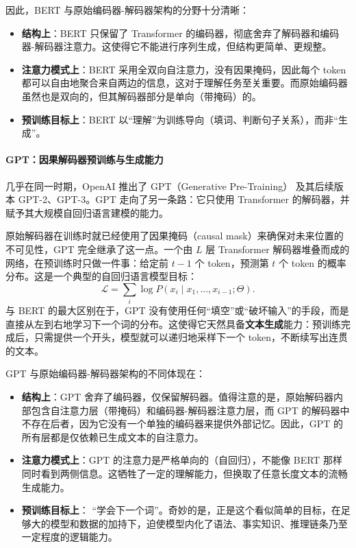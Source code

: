 因此，BERT 与原始编码器-解码器架构的分野十分清晰：
\begin{itemize}
    \item \textbf{结构上}：BERT 只保留了 Transformer 的编码器，彻底舍弃了解码器和编码器-解码器注意力。这使得它不能进行序列生成，但结构更简单、更规整。
    \item \textbf{注意力模式上}：BERT 采用全双向自注意力，没有因果掩码，因此每个 token 都可以自由地聚合来自两边的信息，这对于理解任务至关重要。而原始编码器虽然也是双向的，但其解码器部分是单向（带掩码）的。
    \item \textbf{预训练目标上}：BERT 以“理解”为训练导向（填词、判断句子关系），而非“生成”。
\end{itemize}

\paragraph{GPT：因果解码器预训练与生成能力}

几乎在同一时期，OpenAI 推出了 GPT（Generative Pre-Training）\cite{2018Improving} 及其后续版本 GPT-2、GPT-3\cite{brown2020languagemodelsfewshotlearners}。GPT 走向了另一条路：它只使用 Transformer 的解码器，并赋予其大规模自回归语言建模的能力。

原始解码器在训练时就已经使用了因果掩码（causal mask）来确保对未来位置的不可见性，GPT 完全继承了这一点。一个由 $L$ 层 Transformer 解码器堆叠而成的网络，在预训练时只做一件事：给定前 $t-1$ 个 token，预测第 $t$ 个 token 的概率分布。这是一个典型的自回归语言模型目标：
\[
\mathcal{L} = \sum_{i} \log P(x_i \mid x_1, \dots, x_{i-1}; \Theta).
\]
与 BERT 的最大区别在于，GPT 没有使用任何“填空”或“破坏输入”的手段，而是直接从左到右地学习下一个词的分布。这使得它天然具备\textbf{文本生成}能力：预训练完成后，只需提供一个开头，模型就可以递归地采样下一个 token，不断续写出连贯的文本。

GPT 与原始编码器-解码器架构的不同体现在：
\begin{itemize}
    \item \textbf{结构上}：GPT 舍弃了编码器，仅保留解码器。值得注意的是，原始解码器内部包含自注意力层（带掩码）和编码器-解码器注意力层，而 GPT 的解码器中不存在后者，因为它没有一个单独的编码器来提供外部记忆。因此，GPT 的所有层都是仅依赖已生成文本的自注意力。
    \item \textbf{注意力模式上}：GPT 的注意力是严格单向的（自回归），不能像 BERT 那样同时看到两侧信息。这牺牲了一定的理解能力，但换取了任意长度文本的流畅生成能力。
    \item \textbf{预训练目标上}： “学会下一个词”。奇妙的是，正是这个看似简单的目标，在足够大的模型和数据的加持下，迫使模型内化了语法、事实知识、推理链条乃至一定程度的逻辑能力\cite{brown2020languagemodelsfewshotlearners}。
\end{itemize}

